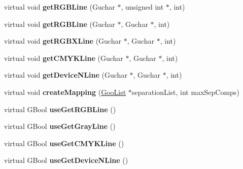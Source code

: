 \begin{DoxyCompactItemize}
virtual void {\bfseries get\+R\+G\+B\+Line} (Guchar $\ast$, unsigned int $\ast$, int)
\item 
\mbox{\label{class_gfx_color_space_acb4b06db7af47cfba3799b505b64a216}} 
virtual void {\bfseries get\+R\+G\+B\+Line} (Guchar $\ast$, Guchar $\ast$, int)
\item 
\mbox{\label{class_gfx_color_space_a39b4b676e836a008a85d221c6ad6224f}} 
virtual void {\bfseries get\+R\+G\+B\+X\+Line} (Guchar $\ast$, Guchar $\ast$, int)
\item 
\mbox{\label{class_gfx_color_space_a910dcaca94d45162d45fa4fc3e39e050}} 
virtual void {\bfseries get\+C\+M\+Y\+K\+Line} (Guchar $\ast$, Guchar $\ast$, int)
\item 
\mbox{\label{class_gfx_color_space_ac202e5c3f35019f469e31c24f8629902}} 
virtual void {\bfseries get\+Device\+N\+Line} (Guchar $\ast$, Guchar $\ast$, int)
\item 
\mbox{\label{class_gfx_color_space_a858450091c4800d3b20f5ec00d3d7bb2}} 
virtual void {\bfseries create\+Mapping} (\hyperlink{class_goo_list}{Goo\+List} $\ast$separation\+List, int max\+Sep\+Comps)
\item 
\mbox{\label{class_gfx_color_space_a5dc3e2f45b27e18903355b372c91b7d3}} 
virtual G\+Bool {\bfseries use\+Get\+R\+G\+B\+Line} ()
\item 
\mbox{\label{class_gfx_color_space_a1ce738aa5f5d2f1003722606131de666}} 
virtual G\+Bool {\bfseries use\+Get\+Gray\+Line} ()
\item 
\mbox{\label{class_gfx_color_space_a658fcf572f3c594da1af8d761e347db2}} 
virtual G\+Bool {\bfseries use\+Get\+C\+M\+Y\+K\+Line} ()
\item 
\mbox{\label{class_gfx_color_space_a05afe94a07e6aef98242e7d91ca321fc}} 
virtual G\+Bool {\bfseries use\+Get\+Device\+N\+Line} ()
\item 
\mbox{\label{class_gfx_color_space_a7c02497043112d539cb9fff80d59a149}} 

\end{DoxyCompactItemize}
